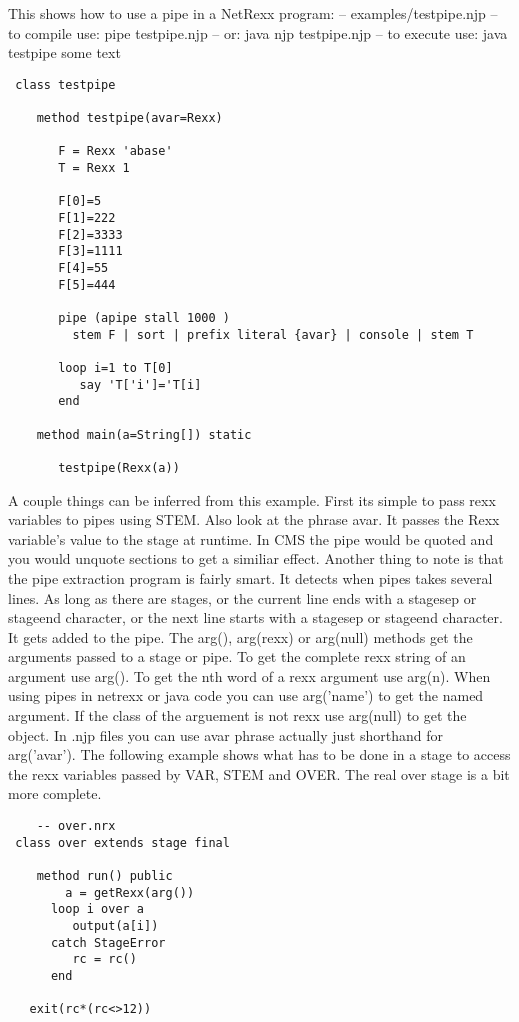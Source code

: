 This shows how to use a pipe in a NetRexx program:
    -- examples/testpipe.njp
    -- to compile use: pipe testpipe.njp
    --             or: java njp testpipe.njp
    -- to execute use: java testpipe some text
\begin{lstlisting}
 class testpipe

    method testpipe(avar=Rexx)

       F = Rexx 'abase'
       T = Rexx 1

       F[0]=5
       F[1]=222
       F[2]=3333
       F[3]=1111
       F[4]=55
       F[5]=444

       pipe (apipe stall 1000 )
         stem F | sort | prefix literal {avar} | console | stem T

       loop i=1 to T[0]
          say 'T['i']='T[i]
       end

    method main(a=String[]) static

       testpipe(Rexx(a))
\end{lstlisting}
 A couple things can be inferred from this example.  First its simple to pass rexx variables to pipes using STEM.  Also look at the  phrase {avar}. It passes the Rexx variable's value to the stage at runtime.  In CMS the pipe would be quoted and you would unquote sections to get a similiar effect.
Another thing to note is that the pipe extraction program is fairly smart. It detects when pipes takes several lines.  As long as there are stages, or the current line ends with a stagesep or stageend character, or the next line starts with a stagesep or stageend character.  It gets added to the pipe.
The arg(), arg(rexx) or arg(null) methods get the arguments passed to a stage or pipe.  To get the complete rexx string of an argument use arg(). To get the nth word of a rexx argument use arg(n).  When using pipes in netrexx or java code you can use arg('name') to get the named argument. If the class of the arguement is not rexx use arg(null) to get the object.
In .njp files you can use {avar} phrase actually just shorthand for  arg('avar').
The following example shows what has to be done in a stage to access the rexx variables passed by VAR, STEM and OVER.  The real  over stage is a bit more complete.
\begin{lstlisting}
    -- over.nrx
 class over extends stage final

    method run() public
        a = getRexx(arg())
      loop i over a
         output(a[i])
      catch StageError
         rc = rc()
      end
    
   exit(rc*(rc<>12))
\end{lstlisting}
